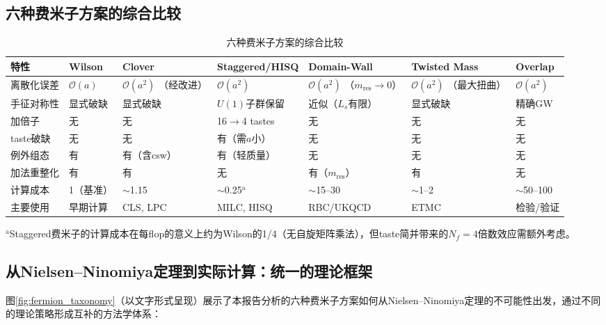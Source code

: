 \documentclass[12pt,a4paper]{ctexart}
\theoremstyle{definition}
\begin{document}
\subsection{六种费米子方案的综合比较}

\begin{table}[H]
\centering
\caption{六种费米子方案的综合比较}
\label{tab:full_comparison}
\small
\begin{tabular}{p{2cm}p{2.2cm}p{2.2cm}p{2.2cm}p{2.2cm}p{2.2cm}}
\toprule
特性 & Wilson & Clover & Staggered/HISQ & Domain-Wall & Twisted Mass & Overlap \\
\midrule
离散化误差 & $\mathcal{O}(a)$ & $\mathcal{O}(a^2)$ {\small（经改进）} & $\mathcal{O}(a^2)$ & $\mathcal{O}(a^2)$ {\small（$m_{\text{res}}\to 0$）} & $\mathcal{O}(a^2)$ {\small（最大扭曲）} & $\mathcal{O}(a^2)$ \\
手征对称性 & 显式破缺 & 显式破缺 & $U(1)$子群保留 & 近似（$L_s$有限） & 显式破缺 & 精确GW \\
加倍子 & 无 & 无 & 16$\to$4 tastes & 无 & 无 & 无 \\
taste破缺 & 无 & 无 & 有（需$a$小） & 无 & 无 & 无 \\
例外组态 & 有 & 有（含csw） & 有（轻质量） & 无 & 无 & 无 \\
加法重整化 & 有 & 有 & 无 & 有（$m_{\text{res}}$） & 有 & 无 \\
计算成本 & 1（基准） & $\sim$1.15 & $\sim$0.25$^{\text{a}}$ & $\sim$15--30 & $\sim$1--2 & $\sim$50--100 \\
主要使用 & 早期计算 & CLS, LPC & MILC, HISQ & RBC/UKQCD & ETMC & 检验/验证 \\
\bottomrule
\end{tabular}

\vspace{3pt}
\footnotesize
$^{\text{a}}$Staggered费米子的计算成本在每flop的意义上约为Wilson的1/4（无自旋矩阵乘法），但taste简并带来的$N_f=4$倍数效应需额外考虑。
\end{table}

\subsection{从Nielsen--Ninomiya定理到实际计算：统一的理论框架}

图\ref{fig:fermion_taxonomy}（以文字形式呈现）展示了本报告分析的六种费米子方案如何从Nielsen--Ninomiya定理的不可能性出发，通过不同的理论策略形成互补的方法学体系：
\end{document}
